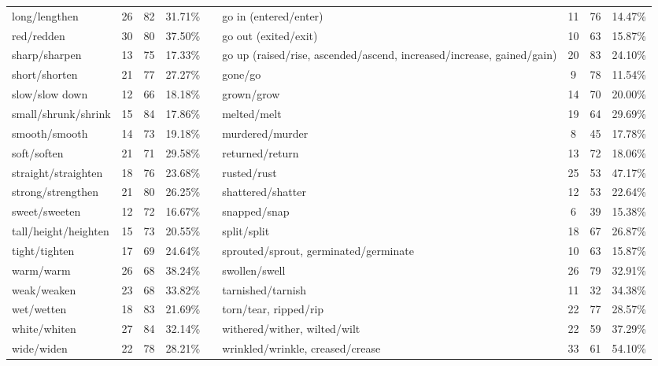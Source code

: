 \begin{tabular}{p{3cm}ccccp{3cm}ccc}
long/lengthen & 26 & 82 & 31.71\% & & go in (entered/enter) & 11 & 76 & 14.47\% \\
red/redden & 30 & 80 & 37.50\% & & go out (exited/exit) & 10 & 63 & 15.87\% \\
sharp/sharpen & 13 & 75 & 17.33\% & & go up (raised/rise, ascended/ascend, increased/increase, gained/gain) & 20 & 83 & 24.10\% \\
short/shorten & 21 & 77 & 27.27\% & & gone/go & 9 & 78 & 11.54\% \\
slow/slow down & 12 & 66 & 18.18\% & & grown/grow & 14 & 70 & 20.00\% \\
small/shrunk/shrink & 15 & 84 & 17.86\% & & melted/melt & 19 & 64 & 29.69\% \\
smooth/smooth & 14 & 73 & 19.18\% & & murdered/murder & 8 & 45 & 17.78\% \\
soft/soften & 21 & 71 & 29.58\% & & returned/return & 13 & 72 & 18.06\% \\
straight/straighten & 18 & 76 & 23.68\% & & rusted/rust & 25 & 53 & 47.17\% \\
strong/strengthen & 21 & 80 & 26.25\% & & shattered/shatter & 12 & 53 & 22.64\% \\
sweet/sweeten & 12 & 72 & 16.67\% & & snapped/snap & 6 & 39 & 15.38\% \\
tall/height/heighten & 15 & 73 & 20.55\% & & split/split & 18 & 67 & 26.87\% \\
tight/tighten & 17 & 69 & 24.64\% & & sprouted/sprout, germinated/germinate & 10 & 63 & 15.87\% \\
warm/warm & 26 & 68 & 38.24\% & & swollen/swell & 26 & 79 & 32.91\% \\
weak/weaken & 23 & 68 & 33.82\% & & tarnished/tarnish & 11 & 32 & 34.38\% \\
wet/wetten & 18 & 83 & 21.69\% & & torn/tear, ripped/rip & 22 & 77 & 28.57\% \\
white/whiten & 27 & 84 & 32.14\% & & withered/wither, wilted/wilt & 22 & 59 & 37.29\% \\
wide/widen & 22 & 78 & 28.21\% & & wrinkled/wrinkle, creased/crease & 33 & 61 & 54.10\%
\end{tabular}
